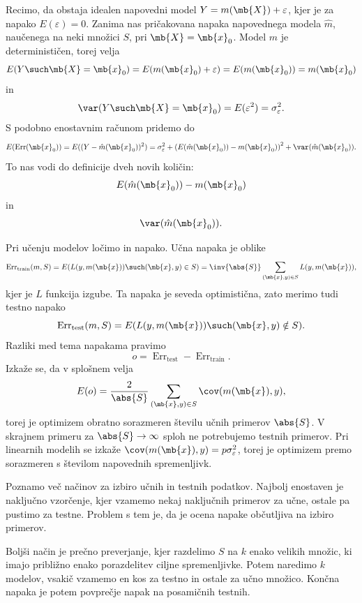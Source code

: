 
Recimo, da obstaja idealen napovedni model $Y = m(\mb{X}) + \varepsilon$, kjer
je za napako $E(\varepsilon) = 0$.
Zanima nas pričakovana napaka napovednega modela $\hat{m}$, naučenega na neki
množici $S$, pri $\mb{X} = \mb{x}_0$.
Model $m$ je determinističen, torej velja
\[
  E(Y \such \mb{X} = \mb{x}_0) = E(m(\mb{x}_0) + \varepsilon) = E(m(\mb{x}_0)) =
  m(\mb{x}_0)
\]
in
\[
  \var(Y \such \mb{X} = \mb{x}_0) = E(\varepsilon^2) = \sigma_\varepsilon^2.
\]
S podobno enostavnim računom pridemo do
\[
  E(\operatorname{Err}(\mb{x}_0))
  = E((Y - \hat{m}(\mb{x}_0))^2)
  = \sigma_\varepsilon^2 + \left( E(\hat{m}(\mb{x}_0)) - m(\mb{x}_0) \right)^2
  + \var(\hat{m}(\mb{x}_0)).
\]
To nas vodi do definicije dveh novih količin: 
\[
  E(\hat{m}(\mb{x}_0)) - m(\mb{x}_0)
\]
in 
\[
  \var(\hat{m}(\mb{x}_0)).
\]


Pri učenju modelov ločimo  in  napako.
Učna napaka je oblike
\[
  \operatorname{Err}_{\text{train}}(m, S)
  = E(L(y, m(\mb{x})) \such (\mb{x}, y) \in S)
  = \inv{\abs{S}} \sum_{(\mb{x}, y) \in S} L(y, m(\mb{x})),
\]
kjer je $L$ funkcija izgube.
Ta napaka je seveda optimistična, zato merimo tudi testno napako
\[
  \operatorname{Err}_{\text{test}}(m, S)
  = E(L(y, m(\mb{x})) \such (\mb{x}, y) \notin S).
\]
Razliki med tema napakama pravimo 
\[
  o = \operatorname{Err}_{\text{test}} - \operatorname{Err}_{\text{train}}.
\]
Izkaže se, da v splošnem velja
\[
  E(o) = \frac{2}{\abs{S}} \sum_{(\mb{x}, y) \in S} \cov(m(\mb{x}), y),
\]
torej je optimizem obratno sorazmeren številu učnih primerov $\abs{S}$.
V skrajnem primeru za $\abs{S} \to \infty$ sploh ne potrebujemo testnih
primerov.
Pri linearnih modelih se izkaže $\cov(m(\mb{x}), y) = p \sigma_\varepsilon^2$,
torej je optimizem premo sorazmeren s številom napovednih spremenljivk.


Poznamo več načinov za izbiro učnih in testnih podatkov.
Najbolj enostaven je naključno vzorčenje, kjer vzamemo nekaj naključnih
primerov za učne, ostale pa pustimo za testne.
Problem s tem je, da je ocena napake občutljiva na izbiro primerov.

Boljši način je prečno preverjanje, kjer razdelimo $S$ na $k$ enako velikih
množic, ki imajo približno enako porazdelitev ciljne spremenljivke.
Potem naredimo $k$ modelov, vsakič vzamemo en kos za testno in ostale za učno
množico.
Končna napaka je potem povprečje napak na posamičnih testnih.

